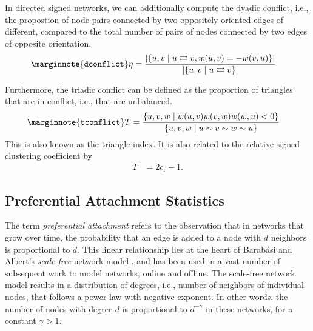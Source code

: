 \documentclass{article}
\begin{document}
In directed signed networks, we can additionally compute the dyadic
conflict, i.e., the propostion of node pairs connected by two oppositely
oriented edges of different, compared to the total number of pairs of
nodes connected by two edges of opposite orientation. 
\begin{align}
  \marginnote{\texttt{dconflict}}
  \eta &= \frac 
       {|\{ u,v \mid u \rightleftarrows v, w(u,v) = - w(v,u) \}|} 
       {|\{ u, v \mid u \rightleftarrows v \}|}
\end{align}

Furthermore, the triadic conflict can be defined as the proportion of
triangles that are in conflict, i.e., that are unbalanced. 
\begin{align}
  \marginnote{\texttt{tconflict}}  
  T &= \frac 
  {\{ u, v, w \mid w(u, v) w(v, w) w(w, u) < 0\}}
  {\{ u, v, w \mid u \sim v \sim w \sim u \}}
\end{align}
This is also known as the triangle index.
It is also related to the relative signed clustering coefficient by
\begin{align*}
T &= 2 c_{\mathrm r} - 1.
\end{align*}

\subsection{Preferential Attachment Statistics}
The term \emph{preferential attachment} refers to the observation that
in networks that grow over time, the probability that an edge is added
to a node with $d$ neighbors is proportional to $d$.  This linear
relationship lies at the heart of Barabási and Albert's
\emph{scale-free} network model \citep{b439}, and has been used in a vast
number of subsequent work to model networks, online and offline. The
scale-free network model results in a distribution of degrees, i.e.,
number of neighbors of individual nodes, that follows a power law with
negative exponent. In other words, the number of nodes with degree $d$ is
proportional to $d^{-\gamma}$ in these networks, for a constant
$\gamma>1$.
\end{document}
